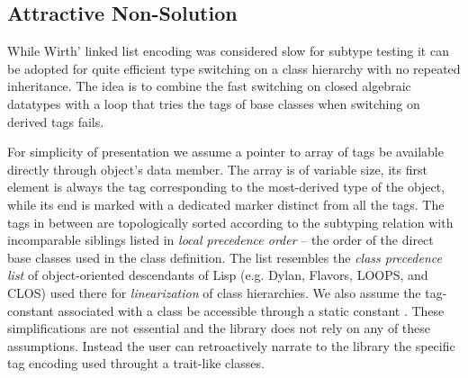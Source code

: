 \subsection{Attractive Non-Solution}
\label{sec:cotc}



While Wirth' linked list encoding was considered slow for subtype testing it can 
be adopted for quite efficient type switching on a class hierarchy with no 
repeated inheritance. The idea is to combine the fast switching on closed 
algebraic datatypes with a loop that tries the tags of base classes when 
switching on derived tags fails.


For simplicity of presentation we assume a pointer to array of tags be available 
directly through object's  data member. The array is of 
variable size, its first element is always the tag corresponding to the 
most-derived type of the object, while its end is marked with a dedicated 
 marker distinct from all the tags. The tags in between are 
topologically sorted according to the subtyping relation with incomparable 
siblings listed in \emph{local precedence order} -- the order of the direct base 
classes used in the class definition. The list resembles the \emph{class 
precedence list} of object-oriented descendants of Lisp (e.g. Dylan, Flavors, 
LOOPS, and CLOS) used there for \emph{linearization} of class hierarchies.
We also assume the tag-constant associated with a class 
 be accessible through a static constant . These 
simplifications are not essential and the library does not rely on any of these 
assumptions. Instead the user can retroactively narrate to the library the 
specific tag encoding used throught a trait-like classes.

